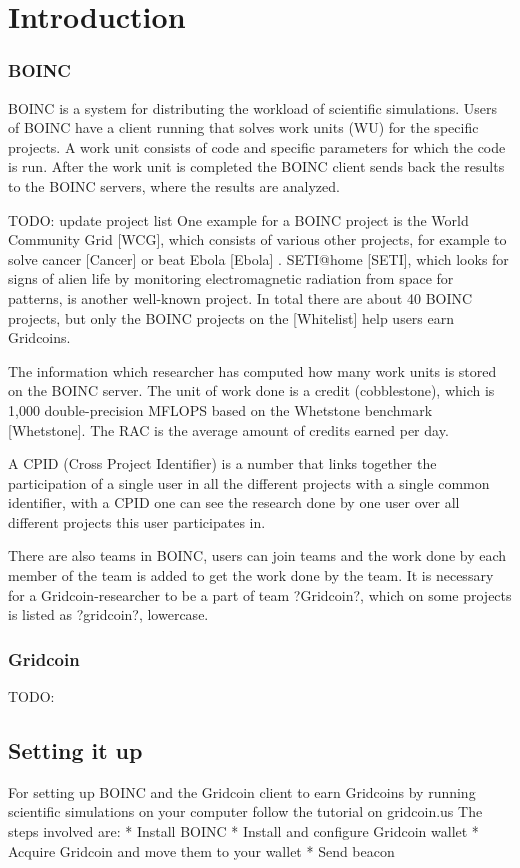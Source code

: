 \section{Introduction}
\label{sec:intro}

\subsubsection{BOINC}

BOINC is a system for distributing the workload of scientific simulations. Users of BOINC have a client running that solves work units (WU) for the specific projects. A work unit consists of code and specific parameters for which the code is run.  After the work unit is completed the BOINC client sends back the results to the BOINC servers, where the results are analyzed.

TODO: update project list
One example for a BOINC project is the World Community Grid [WCG], which consists of various other projects, for example to solve cancer [Cancer] or beat Ebola [Ebola] . SETI@home [SETI], which looks for signs of alien life by monitoring electromagnetic radiation from space for patterns, is another well-known project.  In total there are about 40 BOINC projects, but only the BOINC projects on the [Whitelist] help users earn Gridcoins.

The information which researcher has computed how many work units is stored on the BOINC server. The unit of work done is a credit (cobblestone), which is 1,000 double-precision MFLOPS based on the Whetstone benchmark [Whetstone].  The RAC is the average amount of credits earned  per day.

A CPID (Cross Project Identifier) is a number that links together the participation of a single user in all the different projects with a single common identifier, with a CPID one can see the research done by one user over all different projects this user participates in.

There are also teams in BOINC, users can join teams and the work done by each member of the team is added to get the work done by the team. It is necessary for a Gridcoin-researcher to be a part of team ?Gridcoin?, which on some projects is listed as ?gridcoin?, lowercase.

\subsubsection{Gridcoin}

TODO: 

\subsection{Setting it up}

For setting up BOINC and the Gridcoin client to earn Gridcoins by running scientific simulations on your computer follow the tutorial on gridcoin.us
The steps involved are:
* Install BOINC
* Install and configure Gridcoin wallet 
* Acquire Gridcoin and move them to your wallet
* Send beacon
